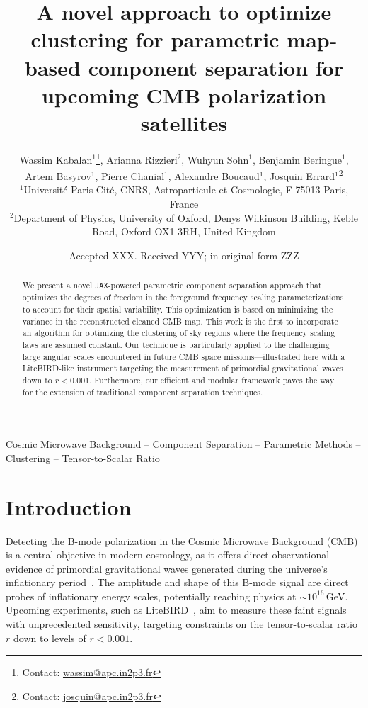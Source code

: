 \documentclass[fleqn,usenatbib]{mnras}
\title[Optimized Clustering for CMB Component Separation]{A novel approach to optimize clustering for parametric map-based component separation for upcoming CMB polarization satellites}
\author[W. Kabalan et al.]{
Wassim Kabalan$^{1}$\thanks{Contact: \href{mailto:wassim@apc.in2p3.fr}{wassim@apc.in2p3.fr}}, 
Arianna Rizzieri$^{2}$,
Wuhyun Sohn$^{1}$,
Benjamin Beringue$^{1}$,
Artem Basyrov$^{1}$,
\newauthor
Pierre Chanial$^{1}$,
Alexandre Boucaud$^{1}$,
Josquin Errard$^{1}$\thanks{Contact: \href{mailto:josquin@apc.in2p3.fr}{josquin@apc.in2p3.fr}}
\\
$^{1}$Université Paris Cité, CNRS, Astroparticule et Cosmologie, F-75013 Paris, France\\
$^{2}$Department of Physics, University of Oxford, Denys Wilkinson Building, Keble Road, Oxford OX1 3RH, United Kingdom
}
\date{Accepted XXX. Received YYY; in original form ZZZ}
\begin{document}
\label{firstpage}
\pagerange{\pageref{firstpage}--\pageref{lastpage}}
\maketitle

\begin{abstract}
We present a novel \texttt{JAX}-powered parametric component separation approach that optimizes the degrees of freedom in the foreground frequency scaling parameterizations to account for their spatial variability. This optimization is based on minimizing the variance in the reconstructed cleaned CMB map. 
This work is the first to incorporate an algorithm for optimizing the clustering of sky regions where the frequency scaling laws are assumed constant. Our technique is particularly applied to the challenging large angular scales encountered in future CMB space missions—illustrated here with a LiteBIRD-like instrument targeting the measurement of primordial gravitational waves down to \( r < 0.001 \). Furthermore, our efficient and modular framework paves the way for the extension of traditional component separation techniques.
\end{abstract}

\begin{keywords}
Cosmic Microwave Background -- Component Separation -- Parametric Methods -- Clustering -- Tensor-to-Scalar Ratio
\end{keywords}




\section{Introduction}

Detecting the B-mode polarization in the Cosmic Microwave Background (CMB) is a central objective in modern cosmology, as it offers direct observational evidence of primordial gravitational waves generated during the universe’s inflationary period~\citep{Kamionkowski1997, Seljak1997}. The amplitude and shape of this B-mode signal are direct probes of inflationary energy scales, potentially reaching physics at $\sim10^{16}$\,GeV. Upcoming experiments, such as LiteBIRD~\citep{LiteBIRD2022}, aim to measure these faint signals with unprecedented sensitivity, targeting constraints on the tensor-to-scalar ratio $r$ down to levels of $r < 0.001$.
\end{document}
